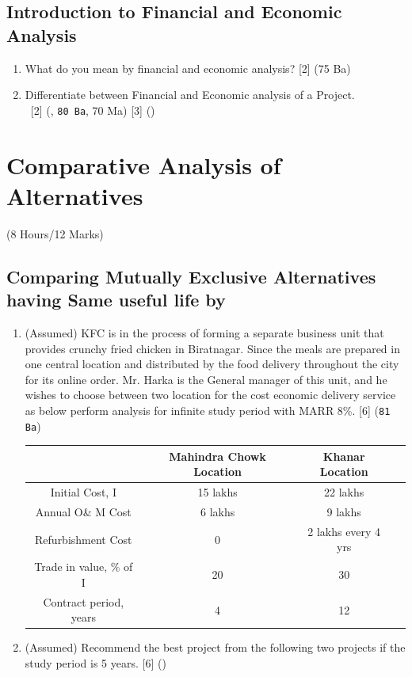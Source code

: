 \documentclass[12pt]{article}
\newcommand{\enter}{\\\textcolor{white}{1}}
\begin{document}
\subsection{Introduction to Financial and Economic Analysis}
\begin{enumerate}[noitemsep, topsep = 0pt]
	\item What do you mean by financial and economic analysis? \hfill [2] (75 Ba)

	\item Differentiate between Financial and Economic analysis of a Project.
	\enter\hfill [2] (, \texttt{80 Ba}, 70 Ma) [3] ()
\end{enumerate}

\pagebreak
\section{Comparative Analysis of Alternatives}
\begin{center}(8 Hours/12 Marks)\end{center}
\subsection{Comparing Mutually Exclusive Alternatives having Same useful life by}
\begin{enumerate}[noitemsep, topsep=0pt]
	\item (Assumed) KFC is in the process of forming a separate business unit that provides crunchy fried chicken in Biratnagar. Since the meals are prepared in one central location and distributed by the food delivery throughout the city for its online order. Mr. Harka is the General manager of this unit, and he wishes to choose between two location for the cost economic delivery service as below perform analysis for infinite study period with MARR 8\%. \hfill [6] (\texttt{81 Ba})\\
	\begin{tabular}{|c|c|c|c|}
		\hline
		 & Mahindra Chowk Location & Khanar Location \\ \hline
		Initial Cost, I & 15 lakhs & 22 lakhs \\ \hline
		Annual O\& M Cost & 6 lakhs & 9 lakhs \\ \hline
		Refurbishment Cost & 0 & 2 lakhs every 4 yrs \\ \hline
		Trade in value, \% of I & 20 & 30 \\ \hline
		Contract period, years & 4 & 12 \\ \hline
	\end{tabular}
	
	\item (Assumed) Recommend the best project from the following two projects if the study period is 5 years. \hfill [6] ()\\
	
\end{enumerate}
\end{document}

